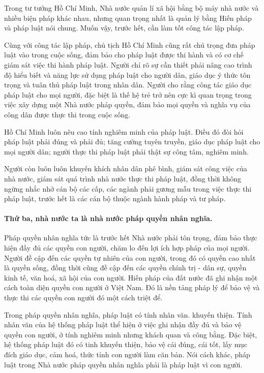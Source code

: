 Trong tư tưởng Hồ Chí Minh, Nhà nước quản lí xã hội bằng bộ máy nhà nước và nhiều biện pháp khác nhau, nhưng quan trọng nhất là quản lý bằng Hiến pháp và pháp luật nói chung. Muốn vậy, trước hết, cần làm tốt công tác lập pháp.

Cùng với công tác lập pháp, chủ tịch Hồ Chí Minh cũng rất chú trọng đưa pháp luật vào trong cuộc sống, đảm bảo cho pháp luật được thi hành và có cơ chế giám sát việc thi hành pháp luật. Người chỉ rõ sự cần thiết phải nâng cao trình độ hiểu biết và năng lực sử dụng pháp luật cho người dân, giáo dục ý thức tôn trọng và tuân thủ pháp luật trong nhân dân. Người cho rằng công tác giáo dục pháp luật cho mọi người, đặc biệt là thế hệ trẻ trở nên cực kì quan trọng trong việc xây dựng một Nhà nước pháp quyền, đảm bảo mọi quyền và nghĩa vụ của công dân được thực thi trong cuộc sống.

Hồ Chí Minh luôn nêu cao tính nghiêm minh của pháp luật. Điều đó đòi hỏi pháp luật phải đúng và phải đủ; tăng cường tuyên truyền, giáo dục pháp luật cho mọi người dân; người thực thi pháp luật phải thật sự công tâm, nghiêm minh.

Người còn luôn luôn khuyến khích nhân dân phê bình, giám sát công việc của nhà nước, giám sát quá trình nhà nước thực thi pháp luật, đồng thời không ngừng nhắc nhở cán bộ các cấp, các ngành phải gương mẫu trong việc thực thi pháp luật, trước hết là các cán bộ thuộc ngành hành pháp và tư pháp.

\paragraph{Thứ ba, nhà nước ta là nhà nước pháp quyền nhân nghĩa.}
Pháp quyền nhân nghĩa tức là trước hết Nhà nước phải tôn trọng, đảm bảo thực hiện đầy đủ các quyền con người, chăm lo đến lợi ích hợp pháp của mọi người. Người đề cập đến các quyền tự nhiên của con người, trong đó có quyền cao nhất là quyền sống, đồng thời cũng đề cập đến các quyền chính trị - dân sự, quyền kinh tế, văn hoá, xã hội của con người. Hiến pháp của đất nước đã ghi nhận một cách toàn diện quyền con người ở Việt Nam. Đó là nền tảng pháp lý để bảo vệ và thực thi các quyền con người đó một cách triệt để.

Trong pháp quyền nhân nghĩa, pháp luật có tính nhân văn. khuyến thiện. Tính nhân văn của hệ thống pháp luật thể hiện ở việc ghi nhận đầy đủ và bảo vệ quyền con người, ở tính nghiêm minh nhưng khách quan và công bằng. Đặc biệt, hệ thống pháp luật đó có tinh khuyến thiện, bảo vệ cái đúng, cái tốt, lấy mục đích giáo dục, cảm hoá, thức tỉnh con người làm căn bản. Nói cách khác, pháp luật trong Nhà nước pháp quyền nhân nghĩa phải là pháp luật vì con người.


